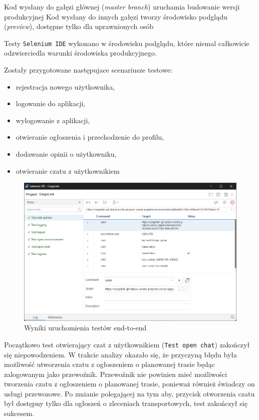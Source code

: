 Kod wysłany do gałęzi głównej (\emph{master branch}) uruchamia budowanie wersji produkcyjnej
Kod wysłany do innych gałęzi tworzy środowisko podglądu (\emph{preview}), dostępne tylko dla uprawnionych osób

Testy \texttt{Selenium IDE} wykonano w środowisku podglądu, które niemal całkowicie odzwierciedla warunki środowiska produkcyjnego.

Zostały przygotowane następujace scenariusze testowe:
\begin{itemize}
  \item rejestracja nowego użytkownika,
  \item logowanie do aplikacji,
  \item wylogowanie z aplikacji,
  \item otwieranie ogłoszenia i przechodzenie do profilu,
  \item dodawanie opinii o użytkowniku,
  \item otwieranie czatu z użytkownikiem
\end{itemize}

\begin{figure}[H]
  \centering
    \includegraphics[width=1\linewidth]{rozdzial2/test_end_to_end_wyniki.png}
  \caption{Wyniki uruchomienia testów end-to-end}
  \label{Testy end-to-end wyniki}
\end{figure}

Początkowo test otwierający czat z użytkownikiem (\texttt{Test open chat}) zakończył się niepowodzeniem. W trakcie analizy okazało się, że przyczyną błędu była możliwość utworzenia czatu z ogłoszeniem o planowanej trasie będąc zalogowanym jako przewoźnik. Przewoźnik nie powinien mieć możliwości tworzenia czatu z ogłoszeniem o planowanej trasie, ponieważ również świadczy on usługi przewozowe. Po zmianie polegającej na tym aby, przycisk otworzenia czatu był dostępny tylko dla ogłoszeń o zleceniach transportowych, test zakończył się sukcesem.

